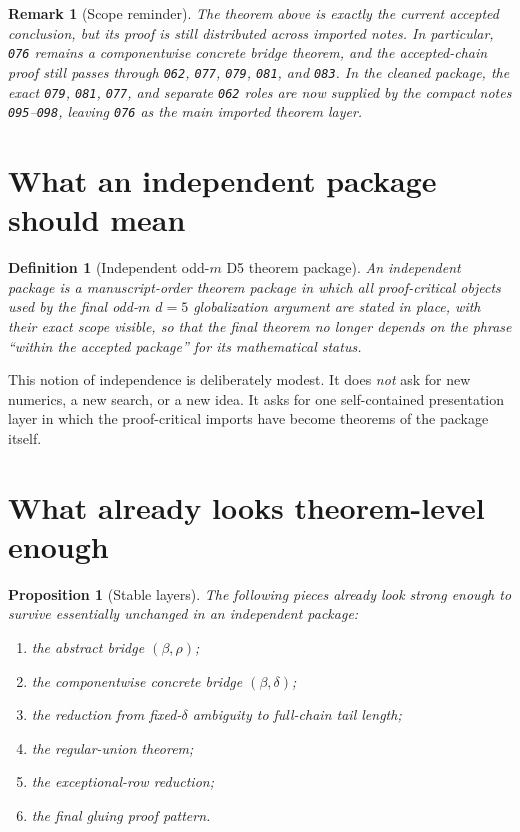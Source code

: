 \documentclass[11pt]{article}
\newtheorem{proposition}[theorem]{Proposition}
\newtheorem{definition}[theorem]{Definition}
\newtheorem{remark}[theorem]{Remark}
\begin{document}
\begin{remark}[Scope reminder]
The theorem above is exactly the current accepted conclusion, but its proof is
still distributed across imported notes. In particular, \texttt{076} remains a
\emph{componentwise} concrete bridge theorem, and the accepted-chain proof
still passes through \texttt{062}, \texttt{077}, \texttt{079}, \texttt{081},
and \texttt{083}. In the cleaned package, the exact \texttt{079},
\texttt{081}, \texttt{077}, and separate \texttt{062} roles are now supplied
by the compact notes \texttt{095}--\texttt{098}, leaving \texttt{076} as the
main imported theorem layer.
\end{remark}

\section{What an independent package should mean}

\begin{definition}[Independent odd-$m$ D5 theorem package]
An \emph{independent package} is a manuscript-order theorem package in which
all proof-critical objects used by the final odd-$m$ $d=5$ globalization
argument are stated in place, with their exact scope visible, so that the
final theorem no longer depends on the phrase ``within the accepted package''
for its mathematical status.
\end{definition}

This notion of independence is deliberately modest. It does \emph{not} ask for
new numerics, a new search, or a new idea. It asks for one self-contained
presentation layer in which the proof-critical imports have become theorems of
the package itself.

\section{What already looks theorem-level enough}

\begin{proposition}[Stable layers]
The following pieces already look strong enough to survive essentially
unchanged in an independent package:
\begin{enumerate}[label=\textup{(\arabic*)},leftmargin=2.2em]
\item the abstract bridge $(\beta,\rho)$;
\item the componentwise concrete bridge $(\beta,\delta)$;
\item the reduction from fixed-$\delta$ ambiguity to full-chain tail length;
\item the regular-union theorem;
\item the exceptional-row reduction;
\item the final gluing proof pattern.
\end{enumerate}
\end{proposition}
\end{document}
